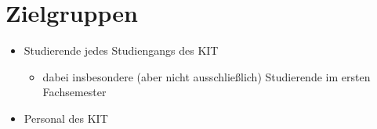 \section{Zielgruppen}

\begin{itemize}
	\item Studierende jedes Studiengangs des \Gls{KIT}
	\begin{itemize}
		\item dabei insbesondere (aber nicht ausschließlich) Studierende im ersten Fachsemester
	\end{itemize}
	\item Personal des \Gls{KIT}
\end{itemize}